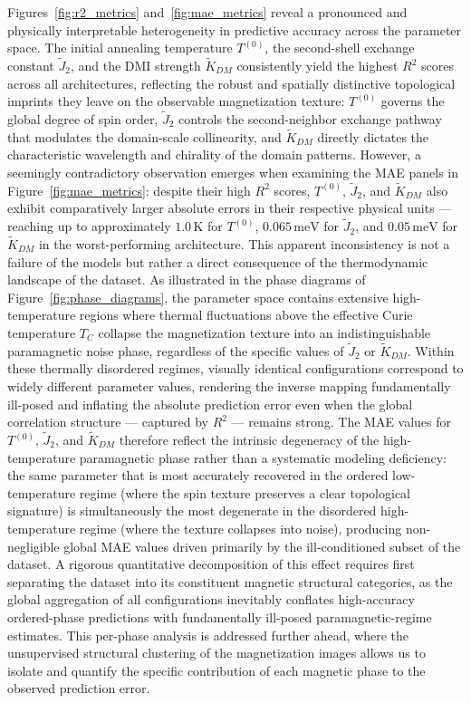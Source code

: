 \documentclass[a4paper,fleqn]{cas-sc}
\begin{document}
Figures~\ref{fig:r2_metrics} and~\ref{fig:mae_metrics} reveal a
pronounced and physically interpretable heterogeneity in predictive
accuracy across the parameter space. The initial annealing temperature
$T^{(0)}$, the second-shell exchange constant $\tilde{J}_2$, and the
DMI strength $\tilde{K}_{DM}$ consistently yield the highest $R^2$
scores across all architectures, reflecting the robust and spatially
distinctive topological imprints they leave on the observable
magnetization texture: $T^{(0)}$ governs the global degree of spin
order, $\tilde{J}_2$ controls the second-neighbor exchange pathway
that modulates the domain-scale collinearity, and $\tilde{K}_{DM}$
directly dictates the characteristic wavelength and chirality of the
domain patterns. However, a seemingly contradictory observation
emerges when examining the MAE panels in Figure~\ref{fig:mae_metrics}:
despite their high $R^2$ scores, $T^{(0)}$, $\tilde{J}_2$, and
$\tilde{K}_{DM}$ also exhibit comparatively larger absolute errors in
their respective physical units --- reaching up to approximately
$1.0\,\mathrm{K}$ for $T^{(0)}$, $0.065\,\mathrm{meV}$ for
$\tilde{J}_2$, and $0.05\,\mathrm{meV}$ for $\tilde{K}_{DM}$ in the
worst-performing architecture. This apparent inconsistency is not a
failure of the models but rather a direct consequence of the
thermodynamic landscape of the dataset. As illustrated in the phase
diagrams of Figure~\ref{fig:phase_diagrams}, the parameter space
contains extensive high-temperature regions where thermal
fluctuations above the effective Curie temperature $T_C$ collapse the
magnetization texture into an indistinguishable paramagnetic noise
phase, regardless of the specific values of $\tilde{J}_2$ or
$\tilde{K}_{DM}$. Within these thermally disordered regimes, visually
identical configurations correspond to widely different parameter
values, rendering the inverse mapping fundamentally ill-posed and
inflating the absolute prediction error even when the global
correlation structure --- captured by $R^2$ --- remains strong. The
MAE values for $T^{(0)}$, $\tilde{J}_2$, and $\tilde{K}_{DM}$
therefore reflect the intrinsic degeneracy of the high-temperature
paramagnetic phase rather than a systematic modeling deficiency: the
same parameter that is most accurately recovered in the ordered
low-temperature regime (where the spin texture preserves a clear
topological signature) is simultaneously the most degenerate in the
disordered high-temperature regime (where the texture collapses into
noise), producing non-negligible global MAE values driven primarily
by the ill-conditioned subset of the dataset. A rigorous quantitative
decomposition of this effect requires first separating the dataset
into its constituent magnetic structural categories, as the global
aggregation of all configurations inevitably conflates high-accuracy
ordered-phase predictions with fundamentally ill-posed
paramagnetic-regime estimates. This per-phase analysis is addressed
further ahead, where the unsupervised structural clustering of the
magnetization images allows us to isolate and quantify the specific
contribution of each magnetic phase to the observed prediction error.
\end{document}
